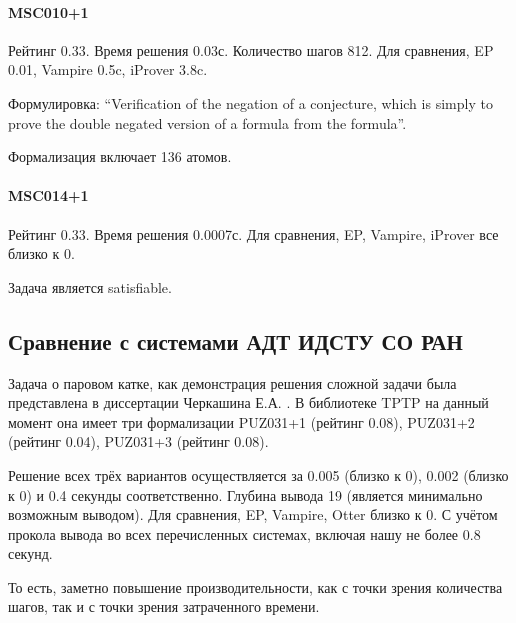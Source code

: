 \paragraph{MSC010+1}
Рейтинг 0.33. Время решения 0.03с. Количество шагов 812. Для сравнения, EP 0.01, Vampire 0.5c, iProver 3.8c.

Формулировка: ``Verification of the negation of a conjecture, which is simply to prove the double negated version of a formula from the formula''.

Формализация включает 136 атомов.



\paragraph{MSC014+1}
Рейтинг 0.33. Время решения 0.0007с. Для сравнения, EP, Vampire, iProver все близко к 0.

Задача является satisfiable.

\subsection{Сравнение с системами АДТ ИДСТУ СО РАН}
Задача о паровом катке, как демонстрация решения сложной задачи была представлена в диссертации Черкашина Е.А. \cite{dissChe}.
В библиотеке TPTP на данный момент она имеет три формализации PUZ031+1 (рейтинг 0.08), PUZ031+2 (рейтинг 0.04), PUZ031+3 (рейтинг 0.08).

Решение всех трёх вариантов осуществляется за 0.005 (близко к 0), 0.002 (близко к 0) и 0.4 секунды соответственно. Глубина вывода 19 (является минимально возможным выводом). Для сравнения, EP, Vampire, Otter близко к 0. С учётом прокола вывода во всех перечисленных системах, включая нашу не более 0.8 секунд.

То есть, заметно повышение производительности, как с точки зрения количества шагов, так и с точки зрения затраченного времени.




